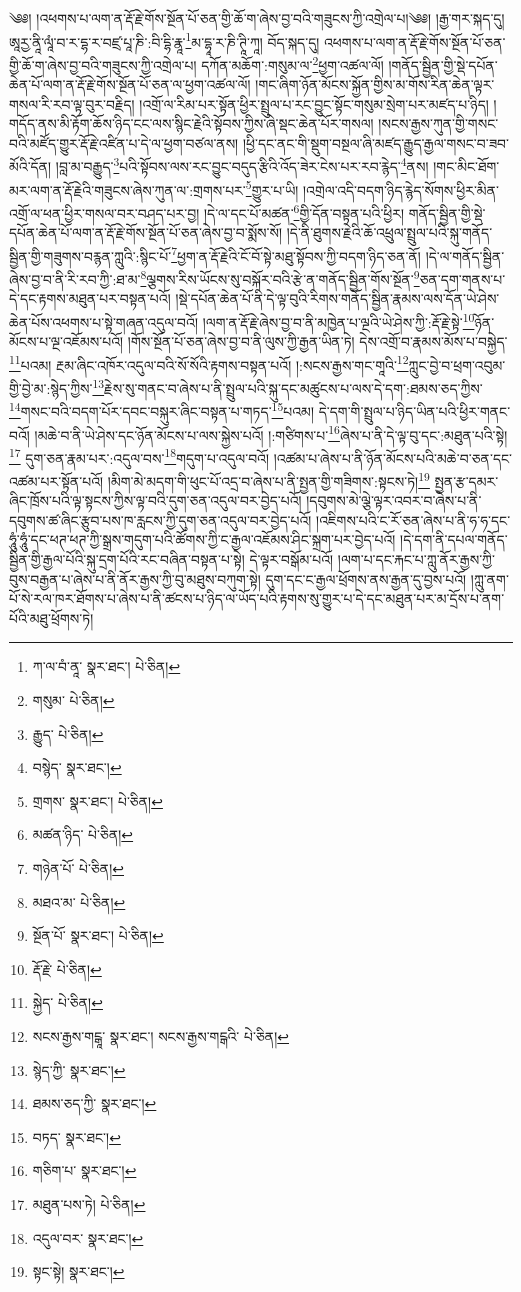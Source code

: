 \setcounter{footnote}{0} 
༄༅། །འཕགས་པ་ལག་ན་རྡོ་རྗེ་གོས་སྔོན་པོ་ཅན་གྱི་ཆོ་ག་ཞེས་བྱ་བའི་གཟུངས་ཀྱི་འགྲེལ་པ།༄༅། །རྒྱ་གར་སྐད་དུ། ཨཱརྱ་ནཱི་ལཱཾ་བ་ར་དྷ་ར་བཛྲ་པཱ་ཎི་:བི་དྷི་རྣཱ་\footnote{ཀ་ལ་བཾ་ནཱ་  སྣར་ཐང་།  པེ་ཅིན། }མ་དྷཱ་ར་ཎི་ཊཱི་ཀཱ། བོད་སྐད་དུ། འཕགས་པ་ལག་ན་རྡོ་རྗེ་གོས་སྔོན་པོ་ཅན་གྱི་ཆོ་ག་ཞེས་བྱ་བའི་གཟུངས་ཀྱི་འགྲེལ་པ། དཀོན་མཆོག་:གསུམ་ལ་\footnote{གསུམ་  པེ་ཅིན། }ཕྱག་འཚལ་ལོ། །གནོད་སྦྱིན་གྱི་སྡེ་དཔོན་ཆེན་པོ་ལག་ན་རྡོ་རྗེ་གོས་སྔོན་པོ་ཅན་ལ་ཕྱག་འཚལ་ལོ། །གང་ཞིག་ཉོན་མོངས་སྐྱོན་གྱིས་མ་གོས་རིན་ཆེན་ལྟར་གསལ་རི་རབ་ལྟ་བུར་བརྗིད། །འགྲོ་ལ་རིམ་པར་སྟོན་ཕྱིར་སྤྲུལ་པ་རང་བྱུང་སྟོང་གསུམ་སྲེག་པར་མཛད་པ་ཉིད། །གདོད་ནས་མི་རྟོག་ཆོས་ཉིད་ངང་ལས་སྙིང་རྗེའི་སྟོབས་ཀྱིས་ཞེ་སྡང་ཆེན་པོར་གསལ། །སངས་རྒྱས་ཀུན་གྱི་གསང་བའི་མཛོད་གྱུར་རྡོ་རྗེ་འཛིན་པ་དེ་ལ་ཕྱག་བཙལ་ནས། །ཕྱི་དང་ནང་གི་སྡུག་བསྔལ་ཞི་མཛད་རྒྱུད་རྒྱལ་གསང་བ་ཟབ་མོའི་དོན། །བླ་མ་བརྒྱུད་\footnote{རྒྱུད་  པེ་ཅིན། }པའི་སྟོབས་ལས་རང་བྱུང་བདུད་རྩིའི་འོད་ཟེར་ངེས་པར་རབ་རྙེད་\footnote{བསྙེད་  སྣར་ཐང་། }ནས། །གང་མིང་ཐོག་མར་ལག་ན་རྡོ་རྗེའི་གཟུངས་ཞེས་ཀུན་ལ་:གྲགས་པར་\footnote{གྲགས་  སྣར་ཐང་།  པེ་ཅིན། }གྱུར་པ་ཡི། །འགྲེལ་འདི་བདག་ཉིད་རྙེད་སོགས་ཕྱིར་མིན་འགྲོ་ལ་ཕན་ཕྱིར་གསལ་བར་བཤད་པར་བྱ། །དེ་ལ་དང་པོ་མཚན་\footnote{མཚན་ཉིད་  པེ་ཅིན། }གྱི་དོན་བསྟན་པའི་ཕྱིར། གནོད་སྦྱིན་གྱི་སྡེ་དཔོན་ཆེན་པོ་ལག་ན་རྡོ་རྗེ་གོས་སྔོན་པོ་ཅན་ཞེས་བྱ་བ་སྨོས་སོ། །དེ་ནི་ཐུགས་རྗེའི་ཆོ་འཕྲུལ་སྤྲུལ་པའི་སྐུ་གནོད་སྦྱིན་གྱི་གཟུགས་བརྙན་ཀླུའི་:སྙིང་པོ་\footnote{གཉེན་པོ་  པེ་ཅིན། }ཕྱག་ན་རྡོ་རྗེའི་ངོ་བོ་སྟེ་མཐུ་སྟོབས་ཀྱི་བདག་ཉིད་ཅན་ནོ། །དེ་ལ་གནོད་སྦྱིན་ཞེས་བྱ་བ་ནི་རི་རབ་ཀྱི་:ཐ་མ་\footnote{མཐའ་མ་  པེ་ཅིན། }ལྕགས་རིས་ཡོངས་སུ་བསྐོར་བའི་རྩེ་ན་གནོད་སྦྱིན་གོས་སྔོན་\footnote{སྔོན་པོ་  སྣར་ཐང་།  པེ་ཅིན། }ཅན་དག་གནས་པ་དེ་དང་རྟགས་མཐུན་པར་བསྟན་པའོ། །སྡེ་དཔོན་ཆེན་པོ་ནི་དེ་ལྟ་བུའི་རིགས་གནོད་སྦྱིན་རྣམས་ལས་དོན་ཡེ་ཤེས་ཆེན་པོས་འཕགས་པ་སྟེ་གཞན་འདུལ་བའོ། །ལག་ན་རྡོ་རྗེ་ཞེས་བྱ་བ་ནི་མཁྱེན་པ་ལྔའི་ཡེ་ཤེས་ཀྱི་:རྡོ་རྗེ་སྟེ་\footnote{རྡོ་རྗེ་  པེ་ཅིན། }ཉོན་མོངས་པ་ལྔ་འཇོམས་པའོ། །གོས་སྔོན་པོ་ཅན་ཞེས་བྱ་བ་ནི་ལུས་ཀྱི་རྒྱན་ཡིན་ཏེ། དེས་འགྲོ་བ་རྣམས་མོས་པ་བསྐྱེད་\footnote{སྐྱེད་  པེ་ཅིན། }པའམ། རྔམ་ཞིང་འཁོར་འདུལ་བའི་སོ་སོའི་རྟགས་བསྟན་པའོ། །:སངས་རྒྱས་གང་གཱའི་\footnote{སངས་རྒྱས་གངྒཱ་  སྣར་ཐང་། སངས་རྒྱས་གངྒའི་  པེ་ཅིན། }ཀླུང་བྱེ་བ་ཕྲག་འབུམ་གྱི་བྱེ་མ་:སྙེད་ཀྱིས་\footnote{སྙེད་ཀྱི་  སྣར་ཐང་། }རྗེས་སུ་གནང་བ་ཞེས་པ་ནི་སྤྲུལ་པའི་སྐུ་དང་མཚུངས་པ་ལས་དེ་དག་:ཐམས་ཅད་ཀྱིས་\footnote{ཐམས་ཅད་ཀྱི་  སྣར་ཐང་། }གསང་བའི་བདག་པོར་དབང་བསྐུར་ཞིང་བསྟན་པ་གཏད་\footnote{བཏད་  སྣར་ཐང་། }པའམ། དེ་དག་གི་སྤྲུལ་པ་ཉིད་ཡིན་པའི་ཕྱིར་གནང་བའོ། །མཆེ་བ་ནི་ཡེ་ཤེས་དང་ཉོན་མོངས་པ་ལས་སྐྱེས་པའོ། །:གཙིགས་པ་\footnote{གཅིག་པ་  སྣར་ཐང་། }ཞེས་པ་ནི་དེ་ལྟ་བུ་དང་:མཐུན་པའི་སྟེ།\footnote{མཐུན་པས་ཏེ།  པེ་ཅིན། } དུག་ཅན་རྣམ་པར་:འདུལ་བས་\footnote{འདུལ་བར་  སྣར་ཐང་། }གདུག་པ་འདུལ་བའོ། །འཚམ་པ་ཞེས་པ་ནི་ཉོན་མོངས་པའི་མཆེ་བ་ཅན་དང་འཚམ་པར་སྟོན་པའོ། །མིག་མེ་མདག་གི་ཕུང་པོ་འདྲ་བ་ཞེས་པ་ནི་སྤྱན་གྱི་གཟིགས་:སྟངས་ཏེ།\footnote{སྟང་སྟེ།  སྣར་ཐང་། } སྤྱན་རྩ་དམར་ཞིང་ཁྲོས་པའི་ལྟ་སྟངས་ཀྱིས་ལྟ་བའི་དུག་ཅན་འདུལ་བར་བྱེད་པའོ། །དབུགས་མེ་ལྕེ་ལྟར་འབར་བ་ཞེས་པ་ནི་དབུགས་ཚ་ཞིང་རྩུབ་པས་ཁ་རླངས་ཀྱི་དུག་ཅན་འདུལ་བར་བྱེད་པའོ། །འཇིགས་པའི་ང་རོ་ཅན་ཞེས་པ་ནི་ཧ་ཧ་དང་ཧཱུཾ་ཧཱུཾ་དང་ཕཊ་ཕཊ་ཀྱི་སྒྲས་གདུག་པའི་ཚོགས་ཀྱི་ང་རྒྱལ་འཇོམས་ཤིང་སྐྲག་པར་བྱེད་པའོ། །དེ་དག་ནི་དཔལ་གནོད་སྦྱིན་གྱི་རྒྱལ་པོའི་སྐུ་དྲག་པོའི་རང་བཞིན་བསྟན་པ་སྟེ། དེ་ལྟར་བསྒོམ་པའོ། །ལག་པ་དང་རྐང་པ་ཀླུ་ནོར་རྒྱས་ཀྱི་བུས་བརྒྱན་པ་ཞེས་པ་ནི་ནོར་རྒྱས་ཀྱི་བུ་མཐུས་བཀུག་སྟེ། དུག་དང་ང་རྒྱལ་ཕྲོགས་ནས་རྒྱན་དུ་བྱས་པའོ། །ཀླུ་ནག་པོ་སེ་རལ་ཁར་ཐོགས་པ་ཞེས་པ་ནི་ཚངས་པ་ཉིད་ལ་ཡོད་པའི་རྟགས་སུ་གྱུར་པ་དེ་དང་མཐུན་པར་མ་དྲོས་པ་ནག་པོའི་མཐུ་ཕྲོགས་ཏེ། 